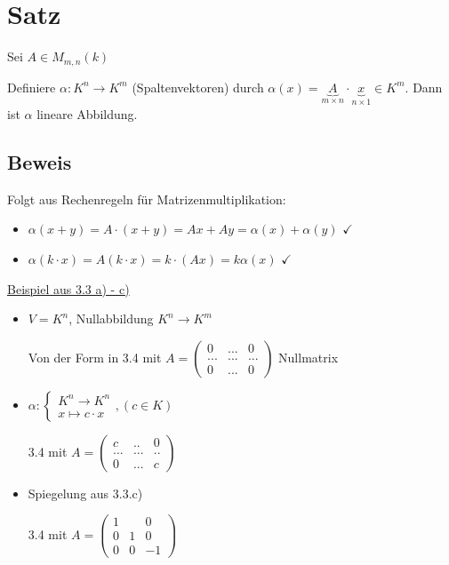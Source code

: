 \documentclass[a4paper, openany]{book}
\begin{document}
      \section{Satz}

      Sei $A \in M_{m,n}(k)$

      Definiere $\alpha: K^n \rightarrow K^m$ (Spaltenvektoren) durch $\alpha(x) = \underbrace{A}_{m \times n} \cdot \underbrace{x}_{n \times 1} \in K^m$. Dann ist $\alpha$ lineare Abbildung.

      \subsection{Beweis}

      Folgt aus Rechenregeln für Matrizenmultiplikation: 

      \begin{itemize}
        \item $\alpha(x+y) = A \cdot (x+y) = Ax + Ay = \alpha(x) + \alpha(y)$ $\checkmark$
        \item $\alpha(k \cdot x) = A (k \cdot x) = k \cdot (Ax) = k \alpha(x)$ $\checkmark$
      \end{itemize}

      \underline{Beispiel aus 3.3 a) - c)}

      \begin{itemize} 
        \item $V = K^n$, Nullabbildung $K^n \rightarrow K^m$

        Von der Form in 3.4 mit $A = \begin{pmatrix}0 & ... & 0 \\ ... & ... &... \\ 0 & ... & 0 \end{pmatrix}$ Nullmatrix

        \item $\alpha: \begin{cases}K^n \rightarrow K^n \\ x \mapsto c \cdot x \end{cases}, (c \in K)$

        3.4 mit $A = \begin{pmatrix}c & .. & 0 \\ ... & ... & .. \\ 0 & ... & c \end{pmatrix}$

        \item Spiegelung aus 3.3.c)

        3.4 mit $A = \begin{pmatrix}1 & & 0 \\ 0 & 1 & 0 \\ 0 & 0 & -1 \end{pmatrix}$
      \end{itemize}
\end{document}
